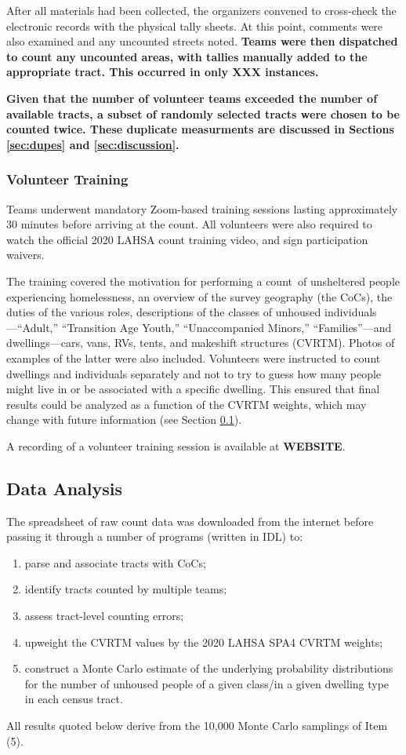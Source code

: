 \documentclass[11pt]{article}
\def\bfr{\bf\color{red}}
\def\Count{count}
\begin{document}
After all materials had been collected, the organizers convened to cross-check the electronic records
with the physical tally sheets. At this point, comments were also examined and any uncounted streets
noted. {\bfr Teams were then dispatched to count any uncounted areas, with tallies manually added
to the appropriate tract. This occurred in only XXX instances.} 

{\bfr Given that the number of volunteer teams exceeded the number of available tracts, a
subset of randomly selected tracts were chosen to be counted twice. These duplicate measurments are 
discussed in Sections \ref{sec:dupes} and \ref{sec:discussion}.}

\subsubsection{Volunteer Training}

Teams underwent mandatory Zoom-based training sessions lasting approximately 30 minutes
before arriving at the count. All volunteers
were also required to watch the official 2020 LAHSA count training video, and sign participation waivers.

The training covered the motivation for performing a \Count\ of unsheltered people experiencing
homelessness, an overview of the survey geography (the CoCs), the duties of the various roles,
descriptions of the classes of unhoused individuals---``Adult,'' ``Transition Age Youth,'' 
``Unaccompanied Minors,'' ``Families''---and dwellings---cars, vans, RVs, tents, and makeshift structures
(CVRTM).
Photos of examples of the latter were also included. Volunteers were instructed to
count dwellings and individuals separately and not to try to guess how many people might live
in or be associated with a specific dwelling. This ensured that final results could be analyzed as a 
function of the CVRTM weights, which may change with future information (see Section 
\ref{sec:analysis}).

A recording of a volunteer training session is available at {\bfr WEBSITE}.

\subsection{Data Analysis}
\label{sec:analysis}

The spreadsheet of raw count data was downloaded from the internet before passing it through a number
of programs (written in IDL) to:
\begin{enumerate}
	\item parse and associate tracts with CoCs;
	\item identify tracts counted by multiple teams;
	\item assess tract-level counting errors;
	\item upweight the CVRTM values by the 2020 LAHSA SPA4 CVRTM weights;
	\item construct a Monte Carlo estimate of the underlying probability distributions
		for the number of unhoused people of a given class/in a given dwelling type
		in each census tract.
\end{enumerate}
All results quoted below derive from the 10,000 Monte Carlo samplings of Item (5).
\end{document}
